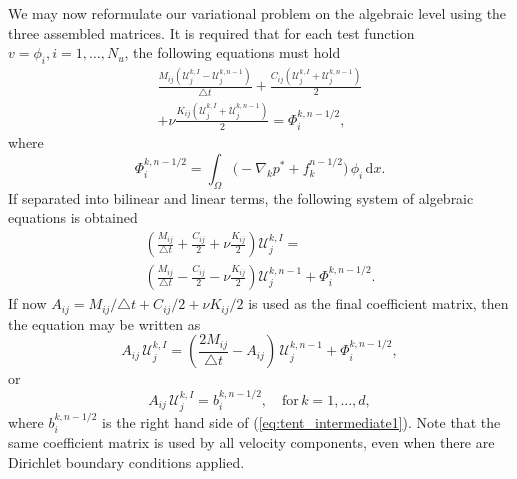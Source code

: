 \documentclass[final,3p,times,twocolumn]{elsarticle}
\newcounter{bla}
\begin{document}
We may now reformulate our variational problem on the algebraic level using the three assembled matrices. It is required that for each test function $v=\phi_i, i=1, \ldots, N_u$, the following equations must hold
\begin{multline}
 \frac{M_{ij}\left(\mathcal{U}_j^{k,I} - \mathcal{U}_j^{k, n-1}\right)}{\triangle t} + \frac{C_{ij}\left(\mathcal{U}_j^{k,I}+\mathcal{U}_j^{k, n-1}\right)}{2} \\ + \nu \frac{K_{ij}\left(\mathcal{U}_j^{k,I} +\mathcal{U}_j^{k, n-1}\right)}{2} = \Phi_i^{k, n-1/2},
\end{multline}
where
\begin{equation}
\Phi_i^{k, n-1/2} = \int_{\Omega} \Big (- \nabla_k p^{*} + f_k^{n-1/2} \Big) \, \phi_i \, \mathrm{d}x.
\end{equation}
If separated into bilinear and linear terms, the following system of algebraic equations is obtained
\begin{multline}
 \left(\frac{M_{ij}}{\triangle t} + \frac{C_{ij}}{2} + \nu\frac{K_{ij}}{2}\right) \mathcal{U}_j^{k,I} = \\
 \left(\frac{M_{ij}}{\triangle t} - \frac{C_{ij}}{2} - \nu\frac{K_{ij}}{2}\right) \mathcal{U}_j^{k, n-1}+\Phi_i^{k, n-1/2}. \label{eq:tent_algebraic}
\end{multline}
If now $A_{ij}= M_{ij}/\triangle t + C_{ij}/2 + \nu K_{ij}/2$ is used as the final coefficient matrix, then the equation may be written as
\begin{equation}
  A_{ij} \, \mathcal{U}_j^{k,I} = \left(\frac{2M_{ij}}{\triangle t} -A_{ij}\right)\, \mathcal{U}_j^{k,n-1} + \Phi_i^{k, n-1/2}, \label{eq:tent_intermediate1}
\end{equation}
or
\begin{equation}
  A_{ij} \, \mathcal{U}_j^{k,I} = b_i^{k, n-1/2}, \quad \text{for}\, k= 1, \ldots, d, \label{eq:Au=b}
\end{equation}
where $b_i^{k, n-1/2}$ is the right hand side of (\ref{eq:tent_intermediate1}). Note that the same coefficient matrix is used by all velocity components, even when there are Dirichlet boundary conditions applied.
\end{document}
